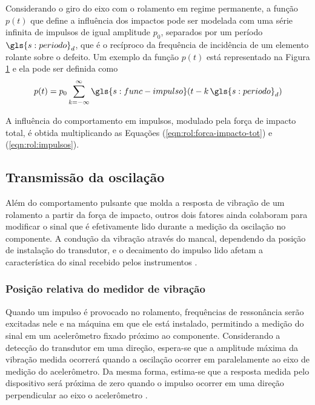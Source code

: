 \documentclass[12pt,oneside,english,brazil,lmodern,siglas,simbolos,cite=num]{ucsmonograph}
\begin{document}
	Considerando o giro do eixo com o rolamento em regime permanente, a função $ p(t) $ que define a influência dos impactos pode ser modelada com uma série infinita de impulsos de igual amplitude $ p_0 $, separados por um período $ \gls{s:periodo}_d $, que é o recíproco da frequência de incidência de um elemento rolante sobre o defeito.
	Um exemplo da função $ p(t) $ está representado na Figura \ref{fig:funcao-impulso} e ela pode ser definida como \cite{mcfadden:1984}
	\begin{equation} \label{eqn:rol:impulsos}
		p(t) = p_0\sum_{k=-\infty}^{\infty}\gls{s:func-impulso}(t-k\,\gls{s:periodo}_d)
	\end{equation}
	\begin{figure}[b]
		\label{fig:funcao-impulso}
	\end{figure}

	A influência do comportamento em impulsos, modulado pela força de impacto total, é obtida multiplicando as Equações (\ref{eqn:rol:forca-impacto-tot}) e (\ref{eqn:rol:impulsos}).
	
	\subsection{Transmissão da oscilação}
	Além do comportamento pulsante que molda a resposta de vibração de um rolamento a partir da força de impacto, outros dois fatores ainda colaboram para modificar o sinal que é efetivamente lido durante a medição da oscilação no componente.
	A condução da vibração através do mancal, dependendo da posição de instalação do transdutor, e o decaimento do impulso lido afetam a característica do sinal recebido pelos instrumentos \cite{mcfadden:1984}.
	
	\subsubsection{Posição relativa do medidor de vibração}
	Quando um impulso é provocado no rolamento, frequências de ressonância serão excitadas nele e na máquina em que ele está instalado, permitindo a medição do sinal em um acelerômetro fixado próximo ao componente.
	Considerando a detecção do transdutor em uma direção, espera-se que a amplitude máxima da vibração medida ocorrerá quando a oscilação ocorrer em paralelamente ao eixo de medição do acelerômetro.
	Da mesma forma, estima-se que a resposta medida pelo dispositivo será próxima de zero quando o impulso ocorrer em uma direção perpendicular ao eixo o acelerômetro \cite{mcfadden:1984}.
	
\end{document}
